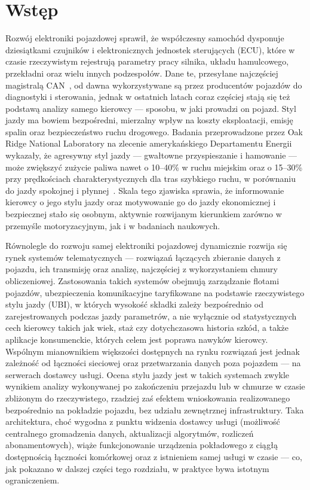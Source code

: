 \clearpage %
\section{Wstęp}

Rozwój elektroniki pojazdowej sprawił, że współczesny samochód dysponuje dziesiątkami
czujników i elektronicznych jednostek sterujących (ECU), które w czasie rzeczywistym
rejestrują parametry pracy silnika, układu hamulcowego, przekładni oraz wielu innych
podzespołów. Dane te, przesyłane najczęściej magistralą CAN~\cite{bosch1991}, od dawna
wykorzystywane są przez producentów pojazdów do diagnostyki i sterowania, jednak
w ostatnich latach coraz częściej stają się też podstawą analizy samego kierowcy ---
sposobu, w jaki prowadzi on pojazd. Styl jazdy ma bowiem bezpośredni, mierzalny wpływ na
koszty eksploatacji, emisję spalin oraz bezpieczeństwo ruchu drogowego. Badania
przeprowadzone przez Oak Ridge National Laboratory na zlecenie amerykańskiego
Departamentu Energii wykazały, że agresywny styl jazdy --- gwałtowne przyspieszanie
i hamowanie --- może zwiększyć zużycie paliwa nawet o 10--40\% w ruchu miejskim oraz
o 15--30\% przy prędkościach charakterystycznych dla tras szybkiego ruchu, w porównaniu
do jazdy spokojnej i płynnej~\cite{thomas2017}. Skala tego zjawiska sprawia, że
informowanie kierowcy o jego stylu jazdy oraz motywowanie go do jazdy ekonomicznej
i bezpiecznej stało się osobnym, aktywnie rozwijanym kierunkiem zarówno w przemyśle
motoryzacyjnym, jak i w badaniach naukowych.

Równolegle do rozwoju samej elektroniki pojazdowej dynamicznie rozwija się rynek
systemów telematycznych --- rozwiązań łączących zbieranie danych z pojazdu, ich
transmisję oraz analizę, najczęściej z wykorzystaniem chmury obliczeniowej.
Zastosowania takich systemów obejmują zarządzanie flotami pojazdów, ubezpieczenia
komunikacyjne taryfikowane na podstawie rzeczywistego stylu jazdy (UBI), w których
wysokość składki zależy bezpośrednio od zarejestrowanych podczas jazdy parametrów,
a nie wyłącznie od statystycznych cech kierowcy takich jak wiek, staż czy dotychczasowa
historia szkód, a także aplikacje konsumenckie, których celem jest poprawa nawyków
kierowcy. Wspólnym
mianownikiem większości dostępnych na rynku rozwiązań jest jednak zależność od
łączności sieciowej oraz przetwarzania danych poza pojazdem --- na serwerach dostawcy
usługi. Ocena stylu jazdy jest w takich systemach zwykle wynikiem analizy wykonywanej
po zakończeniu przejazdu lub w chmurze w czasie zbliżonym do rzeczywistego, rzadziej zaś
efektem wnioskowania realizowanego bezpośrednio na pokładzie pojazdu, bez udziału
zewnętrznej infrastruktury. Taka architektura, choć wygodna z punktu widzenia dostawcy
usługi (możliwość centralnego gromadzenia danych, aktualizacji algorytmów, rozliczeń
abonamentowych), wiąże funkcjonowanie urządzenia pokładowego z ciągłą dostępnością
łączności komórkowej oraz z istnieniem samej usługi w czasie --- co, jak pokazano
w dalszej części tego rozdziału, w praktyce bywa istotnym ograniczeniem.

